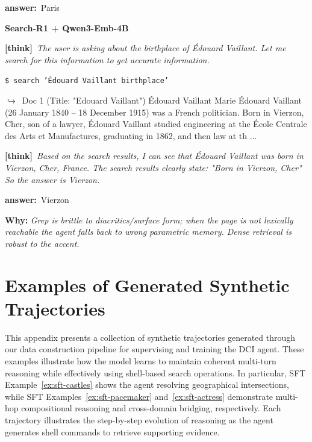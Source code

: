 \documentclass{article} %
\newcommand{\cmark}{\textcolor{green!45!black}{\ding{51}}}
\newcommand{\failbadge}{\colorbox{red!60!black}{\textcolor{white}{\scriptsize\bfseries\,FAILURE\,}}}
\newcommand{\thk}[1]{{\footnotesize\textcolor{violet!75!black}{\textbf{[think]}}\ \textit{#1}\par}}
\newcommand{\cmd}[1]{{\footnotesize\texttt{\textcolor{blue!35!black}{\$\ #1}}\par}}
\newcommand{\retr}[1]{{\footnotesize\textcolor{black!65}{\quad$\hookrightarrow$\ #1}\par}}
\newcommand{\ans}[1]{{\footnotesize\textbf{answer:}\ #1\par}}
\begin{document}
\begin{cmpbox}[label={ex:popqa-vaillant},title={\failbadge\ \ \textsc{PopQA -- diacritic / surface-form brittleness}}]
  \ans{Paris}
\smallskip\par\textbf{Search-R1 + Qwen3-Emb-4B}~\cmark\par
  \thk{The user is asking about the birthplace of Édouard Vaillant. Let me search for this information to get accurate information.}
  \cmd{search 'Édouard Vaillant birthplace'}
  \retr{Doc 1 (Title: "Edouard Vaillant") Édouard Vaillant Marie Édouard Vaillant (26 January 1840 – 18 December 1915) was a French politician. Born in Vierzon, Cher, son of a lawyer, Édouard Vaillant studied engineering at the École Centrale des Arts et Manufactures, graduating in 1862, and then law at th ...}
  \thk{Based on the search results, I can see that Édouard Vaillant was born in Vierzon, Cher, France. The search results clearly state: "Born in Vierzon, Cher" So the answer is Vierzon.}
  \ans{Vierzon}
\smallskip\par\textbf{Why:} \textit{Grep is brittle to diacritics/surface form; when the page is not lexically reachable the agent falls back to wrong parametric memory. Dense retrieval is robust to the accent.}
\end{cmpbox}\bigskip

\newpage
\section{Examples of Generated Synthetic Trajectories}
\label{app:sft-examples}


This appendix presents a collection of synthetic trajectories generated through our data construction pipeline for supervising and training the DCI agent. These examples illustrate how the model learns to maintain coherent multi-turn reasoning while effectively using shell-based search operations. In particular, SFT Example~\ref{ex:sft-castles} shows the agent resolving geographical intersections, while SFT Examples~\ref{ex:sft-pacemaker} and~\ref{ex:sft-actress} demonstrate multi-hop compositional reasoning and cross-domain bridging, respectively. Each trajectory illustrates the step-by-step evolution of reasoning as the agent generates shell commands to retrieve supporting evidence.
\end{document}
